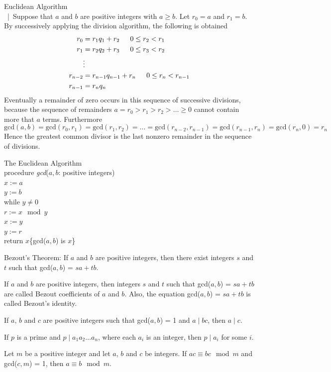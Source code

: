 \documentclass[12pt]{article}
\begin{document}
\begin{alg} Euclidean Algorithm \\~|\ Suppose that $a$ and $b$ are positive integers with $ a \geq b$. Let $r_0 = a$ and $r_1 = b$. By successively applying the division algorithm, the following is obtained $$ \begin{aligned} r_0 &= r_1q_1 + r_2 \indent 0 \leq r_2 < r_1 \\ r_1 &= r_2q_2 + r_3 \indent 0 \leq r_3 < r_2 \\ &\vdots \\ r_{n - 2} &= r_{n - 1}q_{n - 1} + r_n \indent 0 \leq r_n < r_{n - 1} \\ r_{n - 1} &= r_nq_n \end{aligned} $$ Eventually a remainder of zero occurs in this sequence of successive divisions, because the sequence of remainders $a = r_0 > r_1 > r_2 > \dots \geq 0$ cannot contain more that $a$ terms. Furthermore $$\text{gcd}(a, b) = \text{gcd}(r_0, r_1) = \text{gcd}(r_1, r_2) = \dots = \text{gcd}(r_{n - 2}, r_{n - 1}) = \text{gcd}(r_{n - 1}, r_n) = \text{gcd}(r_n, 0) = r_n $$ Hence the greatest common divisor is the last nonzero remainder in the sequence of divisions. \end{alg} 
\begin{alg} The Euclidean Algorithm \\ procedure \textit{gcd}($a, b$: positive integers) \\ $x := a$ \\ $y := b$ \\ while $y \neq 0$ \\ \indent $r:= x \mod y$ \\ \indent $x := y$ \\ \indent $ y:= r$ \\ return $x$\{gcd($a, b$) is $x$\} \end{alg} 
\begin{theorem} Bezout's Theorem: If $a$ and $b$ are positive integers, then there exist integers $s$ and $t$ such that gcd($a, b$) = $sa + tb$. \end{theorem} 
\begin{definition} If $a$ and $b$ are positive integers, then integers $s$ and $t$ such that gcd($a, b$) = $sa + tb$ are called Bezout coefficients of $a$ and $b$. Also, the equation gcd($a, b$) = $sa + tb$ is called Bezout's identity. \end{definition} 
\begin{theorem} If $a$, $b$ and $c$ are positive integers such that gcd($a, b$) = 1 and $a \mid bc$, then $a \mid c$. \end{theorem} 
\begin{theorem} If $p$ is a prime and $p \mid a_1a_2\dots a_n$, where each $a_i$ is an integer, then $p \mid a_i$ for some $i$. \end{theorem} 
\begin{theorem} Let $m$ be a positive integer and let $a$, $b$ and $c$ be integers. If $ac \equiv bc \mod m$ and gcd($c, m$) = 1, then $a \equiv b \mod m$. \end{theorem} 
\end{document}
